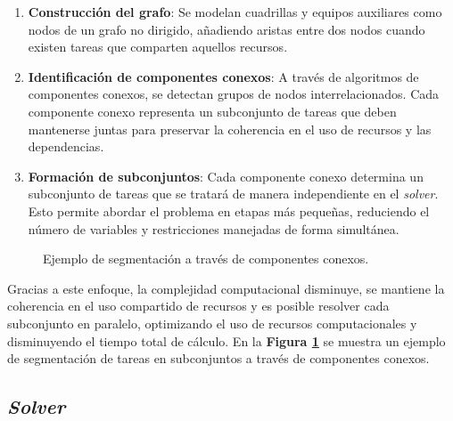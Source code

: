 \documentclass{article}
\begin{document}
\begin{enumerate}[label=\alph*.]
    \item \textbf{Construcción del grafo}: Se modelan cuadrillas y equipos auxiliares como nodos de un grafo no dirigido, añadiendo aristas entre dos nodos cuando existen tareas que comparten aquellos recursos.
    
    \item \textbf{Identificación de componentes conexos}: A través de algoritmos de componentes conexos, se detectan grupos de nodos interrelacionados. Cada componente conexo representa un subconjunto de tareas que deben mantenerse juntas para preservar la coherencia en el uso de recursos y las dependencias.

    \item \textbf{Formación de subconjuntos}: Cada componente conexo determina un subconjunto de tareas que se tratará de manera independiente en el \textit{solver}. Esto permite abordar el problema en etapas más pequeñas, reduciendo el número de variables y restricciones manejadas de forma simultánea.
\end{enumerate}


\begin{figure}[htbp]
    \centering
    \caption{Ejemplo de segmentación a través de componentes conexos.}
    \label{fig:segmentacion}
\end{figure}


Gracias a este enfoque, la complejidad computacional disminuye, se mantiene la coherencia en el uso compartido de recursos y es posible resolver cada subconjunto en paralelo, optimizando el uso de recursos computacionales y disminuyendo el tiempo total de cálculo. En la \textbf{Figura \ref{fig:segmentacion}} se muestra un ejemplo de segmentación de tareas en subconjuntos a través de componentes conexos.


\subsection{\textit{Solver}}
\end{document}
